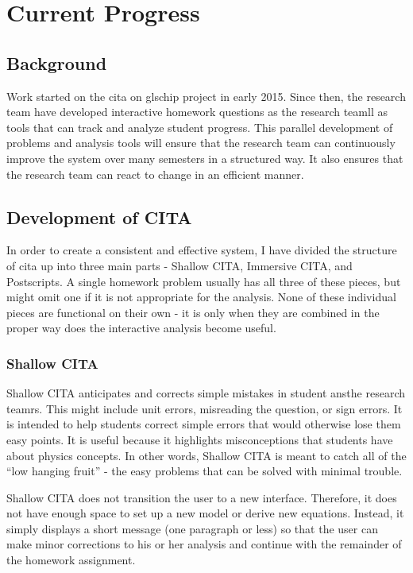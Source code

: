 \chapter[Current Progress]{Current Progress}

\section{Background}

Work started on the \gls{cita} on gls{chip} project in early 2015. Since then, the research team have developed interactive homework questions as the research teamll as tools that can track and analyze student progress. This parallel development of problems and analysis tools will ensure that the research team can continuously improve the system over many semesters in a structured way. It also ensures that the research team can react to change in an efficient manner.

\section{Development of CITA}

In order to create a consistent and effective system, I have divided the structure of \gls{cita} up into three main parts - Shallow CITA, Immersive CITA, and Postscripts. A single homework problem usually has all three of these pieces, but might omit one if it is not appropriate for the analysis. None of these individual pieces are functional on their own - it is only when they are combined in the proper way does the interactive analysis become useful.

\subsection{Shallow CITA}

Shallow CITA anticipates and corrects simple mistakes in student ansthe research teamrs. This might include unit errors, misreading the question, or sign errors. It is intended to help students correct simple errors that would otherwise lose them easy points. It is useful because it highlights misconceptions that students have about physics concepts. In other words, Shallow CITA is meant to catch all of the ``low hanging fruit'' - the easy problems that can be solved with minimal trouble.

Shallow CITA does not transition the user to a new interface. Therefore, it does not have enough space to set up a new model or derive new equations. Instead, it simply displays a short message (one paragraph or less) so that the user can make minor corrections to his or her analysis and continue with the remainder of the homework assignment.

